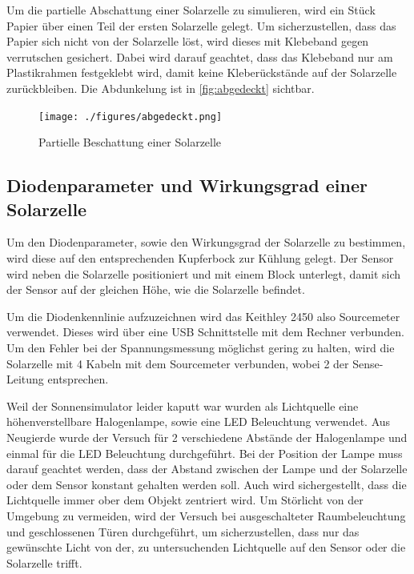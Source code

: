 \documentclass[12pt,english,ngerman]{scrartcl}
\begin{document}
Um die partielle Abschattung einer Solarzelle zu simulieren, wird ein Stück
Papier über einen Teil der ersten Solarzelle gelegt. Um sicherzustellen, dass
das Papier sich nicht von der Solarzelle löst, wird dieses mit Klebeband gegen
verrutschen gesichert. Dabei wird darauf geachtet, dass das Klebeband nur am
Plastikrahmen festgeklebt wird, damit keine Kleberückstände auf der Solarzelle
zurückbleiben. Die Abdunkelung ist in \autoref{fig:abgedeckt} sichtbar.

\begin{figure}[H]
	\begin{center}
		\texttt{[image: ./figures/abgedeckt.png]}
	\end{center}
	\caption{Partielle Beschattung einer Solarzelle
	}\label{fig:abgedeckt}
\end{figure}

\subsection{Diodenparameter und Wirkungsgrad einer Solarzelle}

Um den Diodenparameter, sowie den Wirkungsgrad der Solarzelle zu bestimmen,
wird diese auf den entsprechenden Kupferbock zur Kühlung gelegt. Der Sensor
wird neben die Solarzelle positioniert und mit einem Block unterlegt, damit
sich der Sensor auf der gleichen Höhe, wie die Solarzelle befindet.

Um die Diodenkennlinie aufzuzeichnen wird das Keithley 2450 also Sourcemeter
verwendet. Dieses wird über eine USB Schnittstelle mit dem Rechner verbunden.
Um den Fehler bei der Spannungsmessung möglichst gering zu halten, wird die
Solarzelle mit 4 Kabeln mit dem Sourcemeter verbunden, wobei 2 der
Sense-Leitung entsprechen.

Weil der Sonnensimulator leider kaputt war wurden als Lichtquelle eine
höhenverstellbare Halogenlampe, sowie eine LED Beleuchtung verwendet. 
Aus Neugierde wurde der Versuch für 2 verschiedene Abstände der Halogenlampe
und einmal für die LED Beleuchtung durchgeführt. Bei der
Position der Lampe muss darauf geachtet werden, dass der Abstand zwischen der
Lampe und der Solarzelle oder dem Sensor konstant gehalten werden soll. Auch
wird sichergestellt, dass die Lichtquelle immer ober dem Objekt zentriert wird.
Um Störlicht von der Umgebung zu vermeiden, wird der Versuch bei
ausgeschalteter Raumbeleuchtung und geschlossenen Türen durchgeführt, um
sicherzustellen, dass nur das gewünschte Licht von der, zu untersuchenden
Lichtquelle auf den Sensor oder die Solarzelle trifft.
\end{document}
